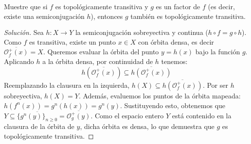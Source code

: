 \begin{ejercicio}
	Muestre que si $f$ es topológicamente transitiva y $g$ es un factor de $f$ (es decir, existe una semiconjugación $h$), entonces $g$ también es topológicamente transitiva.
\end{ejercicio}
\begin{proof}[Solución]
	Sea $h: X \to Y$ la semiconjugación sobreyectiva y continua ($h \circ f = g \circ h$). Como $f$ es transitiva, existe un punto $x \in X$ con órbita densa, es decir $\overline{\mathcal{O}_f^+(x)} = X$.
	Queremos evaluar la órbita del punto $y = h(x)$ bajo la función $g$.
	Aplicando $h$ a la órbita densa, por continuidad de $h$ tenemos:
	$$h\left(\overline{\mathcal{O}_f^+(x)}\right) \subseteq \overline{h(\mathcal{O}_f^+(x))}$$
	Reemplazando la clausura en la izquierda, $h(X) \subseteq \overline{h(\mathcal{O}_f^+(x))}$. Por ser $h$ sobreyectiva, $h(X) = Y$.
	Además, evaluemos los puntos de la órbita mapeada:
	$h(f^n(x)) = g^n(h(x)) = g^n(y)$.
	Sustituyendo esto, obtenemos que $Y \subseteq \overline{\{g^n(y)\}_{n \ge 0}} = \overline{\mathcal{O}_g^+(y)}$.
	Como el espacio entero $Y$ está contenido en la clausura de la órbita de $y$, dicha órbita es densa, lo que demuestra que $g$ es topológicamente transitiva.
\end{proof}

